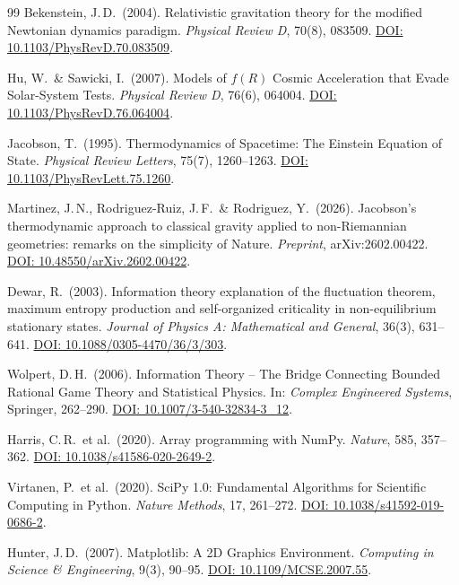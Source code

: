 \documentclass[aps,prd,twocolumn,superscriptaddress,nofootinbib]{revtex4-2}
\begin{document}
\begin{thebibliography}{99}
Bekenstein, J.\,D.\ (2004).
Relativistic gravitation theory for the modified Newtonian dynamics paradigm.
\textit{Physical Review D}, 70(8), 083509.
\href{https://doi.org/10.1103/PhysRevD.70.083509}{DOI: 10.1103/PhysRevD.70.083509}.

Hu, W.\ \& Sawicki, I.\ (2007).
Models of $f(R)$ Cosmic Acceleration that Evade Solar-System Tests.
\textit{Physical Review D}, 76(6), 064004.
\href{https://doi.org/10.1103/PhysRevD.76.064004}{DOI: 10.1103/PhysRevD.76.064004}.

Jacobson, T.\ (1995).
Thermodynamics of Spacetime: The Einstein Equation of State.
\textit{Physical Review Letters}, 75(7), 1260--1263.
\href{https://doi.org/10.1103/PhysRevLett.75.1260}{DOI: 10.1103/PhysRevLett.75.1260}.

Martinez, J.\,N., Rodriguez-Ruiz, J.\,F.\ \& Rodriguez, Y.\ (2026).
Jacobson's thermodynamic approach to classical gravity applied to non-Riemannian geometries: remarks on the simplicity of Nature.
\textit{Preprint}, arXiv:2602.00422.
\href{https://doi.org/10.48550/arXiv.2602.00422}{DOI: 10.48550/arXiv.2602.00422}.

Dewar, R.\ (2003).
Information theory explanation of the fluctuation theorem, maximum entropy production and self-organized criticality in non-equilibrium stationary states.
\textit{Journal of Physics A: Mathematical and General}, 36(3), 631--641.
\href{https://doi.org/10.1088/0305-4470/36/3/303}{DOI: 10.1088/0305-4470/36/3/303}.

Wolpert, D.\,H.\ (2006).
Information Theory -- The Bridge Connecting Bounded Rational Game Theory and Statistical Physics.
In: \textit{Complex Engineered Systems}, Springer, 262--290.
\href{https://doi.org/10.1007/3-540-32834-3_12}{DOI: 10.1007/3-540-32834-3\_12}.

Harris, C.\,R.\ et al.\ (2020).
Array programming with NumPy.
\textit{Nature}, 585, 357--362.
\href{https://doi.org/10.1038/s41586-020-2649-2}{DOI: 10.1038/s41586-020-2649-2}.

Virtanen, P.\ et al.\ (2020).
SciPy 1.0: Fundamental Algorithms for Scientific Computing in Python.
\textit{Nature Methods}, 17, 261--272.
\href{https://doi.org/10.1038/s41592-019-0686-2}{DOI: 10.1038/s41592-019-0686-2}.

Hunter, J.\,D.\ (2007).
Matplotlib: A 2D Graphics Environment.
\textit{Computing in Science \& Engineering}, 9(3), 90--95.
\href{https://doi.org/10.1109/MCSE.2007.55}{DOI: 10.1109/MCSE.2007.55}.


\end{thebibliography}
\end{document}
